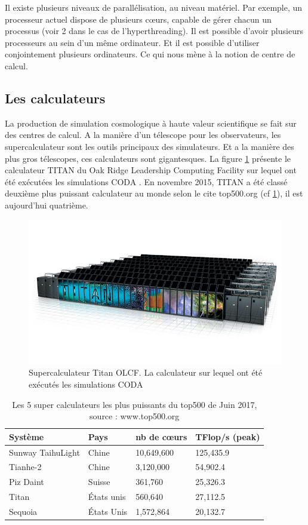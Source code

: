 Il existe plusieurs niveaux de parallélisation, au niveau matériel.
Par exemple, un processeur actuel dispose de plusieurs cœurs, capable de gérer chacun un processus (voir 2 dans le cas de l'hyperthreading).
Il est possible d'avoir plusieurs processeurs au sein d'un même ordinateur.
Et il est possible d'utiliser conjointement plusieurs ordinateurs.
Ce qui nous mène à la notion de centre de calcul.

\subsection{Les calculateurs}
\label{sec:titan}
La production de simulation cosmologique à haute valeur scientifique se fait sur des centres de calcul.
A la manière d'un télescope pour les observateurs, les supercalculateur sont les outils principaux des simulateurs.
Et a la manière des plus gros télescopes, ces calculateurs sont gigantesques.
La figure \ref{fig:titan} présente le calculateur TITAN du Oak Ridge Leadership Computing Facility sur lequel ont été exécutées les simulations CODA \citep{ocvirk_cosmic_2015}.
En novembre 2015, TITAN a été classé deuxième plus puissant calculateur au monde selon le cite top500.org (cf \ref{tab:top500}), il est aujourd'hui quatrième.

\begin{figure}[bth]
        \includegraphics[width=.95\linewidth]{img/02/titan.jpg} 
        \caption[Titan]{Supercalculateur Titan OLCF.
        La calculateur sur lequel ont été exécutés les simulations CODA}
 		\label{fig:titan}
\end{figure}

\begin{table}[bth]
\begin{tabular}{ l l l l }
\hline 
Système & Pays & nb de cœurs & TFlop/s (peak) \\
\hline 
Sunway TaihuLight & Chine & 10,649,600 & 125,435.9 \\ 
Tianhe-2  & Chine & 3,120,000 & 54,902.4 \\ 
Piz Daint  & Suisse & 361,760 & 25,326.3 \\ 
Titan  & États unis & 560,640 & 27,112.5 \\ 
Sequoia  & États Unis &1,572,864 & 20,132.7 \\ 
\end{tabular} 
\caption[TOP500]{Les 5 super calculateurs les plus puissants du top500 de Juin 2017, source : www.top500.org}
\label{tab:top500}
\end{table}


